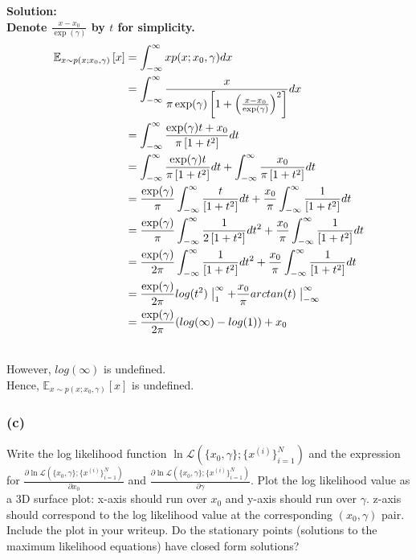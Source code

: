 \documentclass[11pt]{article}
\begin{document}
	{\noindent \bf Solution: 
	\ \\
	Denote $\frac{x-x_0}{\exp(\gamma)}$ by $t$ for simplicity. 
	\begin{equation}
	    \begin{split}
	        \mathbb{E}_{x \sim p( x ; x_0, \gamma )} \left [x \right ] &=
	        \int_{-\infty}^{\infty} x p( x ; x_0, \gamma )dx \\
	        &=\int_{-\infty}^{\infty} \frac{x}{\pi\exp( \gamma) \left [ 
	1 + \left( \frac{x - x_0}{\exp(\gamma)} \right)^2 \right ]}dx\\
	        &=\int_{-\infty}^{\infty} \frac{\exp(\gamma)t+x_0}{\pi \left [ 
	1 + t^2 \right ]}dt \\
	&= \int_{-\infty}^{\infty} \frac{\exp(\gamma)t}{\pi \left [ 
	1 + t^2 \right ]}dt +\int_{-\infty}^{\infty} \frac{x_0}{\pi \left [ 
	1 + t^2 \right ]}dt\\
	&= \frac{\exp(\gamma)}{\pi}\int_{-\infty}^{\infty} \frac{t}{ \left [ 
	1 + t^2 \right ]}dt + \frac{x_0}{\pi}\int_{-\infty}^{\infty} \frac{1}{ \left [ 
	1 + t^2 \right ]}dt\\
	&=\frac{\exp(\gamma)}{\pi}\int_{-\infty}^{\infty} \frac{1}{ 2\left [ 
	1 + t^2 \right ]}dt^2 + \frac{x_0}{\pi}\int_{-\infty}^{\infty} \frac{1}{ \left [ 
	1 + t^2 \right ]}dt\\
	&=\frac{\exp(\gamma)}{2\pi}\int_{-\infty}^{\infty} \frac{1}{ \left [ 
	1 + t^2 \right ]}dt^2 + \frac{x_0}{\pi}\int_{-\infty}^{\infty} \frac{1}{ \left [ 
	1 + t^2 \right ]}dt\\
	&=\frac{\exp(\gamma)}{2\pi}log(t^2)\bigm|_{1}^{\infty} + \frac{x_0}{\pi}arctan(t)\bigm|_{-\infty}^{\infty}\\
	&=\frac{\exp(\gamma)}{2\pi}(log(\infty)-log(1))+x_0
	    \end{split}
	\end{equation}
	
	\ \\
	However, $log(\infty)$ is undefined.
	\ \\
    Hence, $\mathbb{E}_{x \sim p( x ; x_0, \gamma )} \left [x \right ]$ is undefined.	
	}
	
	\vfill
	
	\subsubsection*{(c)}
	Write the log likelihood function $\ln \mathcal{L}(\{x_0, \gamma\}; \{x^{(i)}\}_{i = 1}^N)$ and
	the expression for 
	$\frac{\partial \ln \mathcal{L}( \{x_0, \gamma\}; \{x^{(i)}\}_{i = 1}^N)}
	{\partial x_0}$ and $\frac{\partial 
		\ln \mathcal{L}(\{x_0, \gamma\}; \{x^{(i)}\}_{i = 1}^N)}
	{\partial \gamma}$.
	Plot the log likelihood value as a 3D surface plot: x-axis should run over $x_0$ and
	y-axis should run over $\gamma$. z-axis should correspond to the log likelihood value at
	the corresponding $(x_0, \gamma)$ pair. Include the plot in your writeup.
	 Do the stationary points (solutions to the maximum likelihood equations) have closed form solutions?
	 
\end{document}
